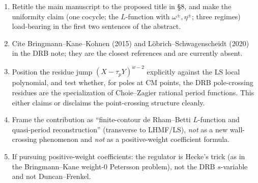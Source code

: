 \documentclass[11pt]{article}
\newcommand{\taup}{\tau_p}
\begin{document}
\begin{enumerate}[leftmargin=1.6em]
\item Retitle the main manuscript to the proposed title in \S8, and make the uniformity
claim (one cocycle; the $L$-function with $\omega^{\pm},\eta^{\pm}$; three regimes)
load-bearing in the first two sentences of the abstract.
\item Cite Bringmann--Kane--Kohnen (2015) and L\"obrich--Schwagenscheidt (2020) in the DRB
note; they are the closest references and are currently absent.
\item Position the residue jump $(X-\taup Y)^{w-2}$ explicitly against the LS local
polynomial, and test whether, for poles at CM points, the DRB pole-crossing residues are
the specialization of Choie--Zagier rational period functions. This either claims or
disclaims the point-crossing structure cleanly.
\item Frame the contribution as ``finite-contour de Rham--Betti $L$-function and
quasi-period reconstruction'' (transverse to LHMF/LS), \emph{not} as a new wall-crossing
phenomenon and \emph{not} as a positive-weight coefficient formula.
\item If pursuing positive-weight coefficients: the regulator is Hecke's trick (as in the
Bringmann--Kane weight-$0$ Petersson problem), not the DRB $s$-variable and not
Duncan--Frenkel.
\end{enumerate}
\end{document}
